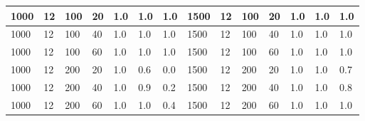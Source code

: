 \begin{table}[H]
\begin{tabular}{|l|l|l|l|l|l|l|l|l|l|l|l|l|l|}
1000                    & 12                     & 100                    & 20                      & 1.0                       & 1.0                    & 1.0                     & 1500                   & 12                     & 100                    & 20                      & 1.0                       & 1.0                    & 1.0                     \\ \hline
1000                    & 12                     & 100                    & 40                      & 1.0                       & 1.0                    & 1.0                     & 1500                   & 12                     & 100                    & 40                      & 1.0                       & 1.0                    & 1.0                     \\ \hline
1000                    & 12                     & 100                    & 60                      & 1.0                       & 1.0                    & 1.0                     & 1500                   & 12                     & 100                    & 60                      & 1.0                       & 1.0                    & 1.0                     \\ \hline
1000                    & 12                     & 200                    & 20                      & 1.0                       & 0.6                    & 0.0                     & 1500                   & 12                     & 200                    & 20                      & 1.0                       & 1.0                    & 0.7                     \\ \hline
1000                    & 12                     & 200                    & 40                      & 1.0                       & 0.9                    & 0.2                     & 1500                   & 12                     & 200                    & 40                      & 1.0                       & 1.0                    & 0.8                     \\ \hline
1000                    & 12                     & 200                    & 60                      & 1.0                       & 1.0                    & 0.4                     & 1500                   & 12                     & 200                    & 60                      & 1.0                       & 1.0                    & 1.0                     \\ \hline
\end{tabular}
\end{table}
